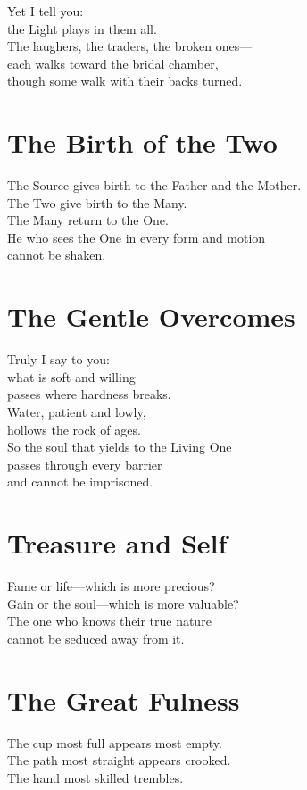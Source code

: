 \documentclass[10pt, openright]{book}
\begin{document}
Yet I tell you: \\
the Light plays in them all. \\
The laughers, the traders, the broken ones--- \\
each walks toward the bridal chamber, \\
though some walk with their backs turned.

\section{The Birth of the Two}
The Source gives birth to the Father and the Mother. \\
The Two give birth to the Many. \\
The Many return to the One. \\

He who sees the One in every form and motion \\
cannot be shaken.

\section{The Gentle Overcomes}
Truly I say to you: \\
what is soft and willing \\
passes where hardness breaks. \\
Water, patient and lowly, \\
hollows the rock of ages. \\

So the soul that yields to the Living One \\
passes through every barrier \\
and cannot be imprisoned.

\section{Treasure and Self}
Fame or life—which is more precious? \\
Gain or the soul—which is more valuable? \\

The one who knows their true nature \\
cannot be seduced away from it.

\section{The Great Fulness}
The cup most full appears most empty. \\
The path most straight appears crooked. \\
The hand most skilled trembles. \\
\end{document}
